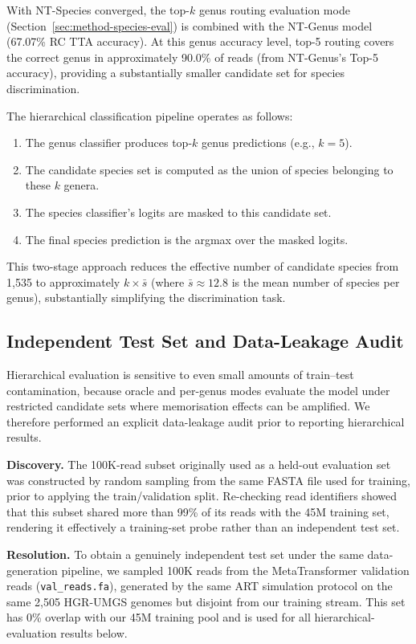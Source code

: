 With NT-Species converged, the top-$k$ genus routing evaluation mode (Section~\ref{sec:method-species-eval}) is combined with the NT-Genus model (67.07\% RC TTA accuracy). At this genus accuracy level, top-5 routing covers the correct genus in approximately 90.0\% of reads (from NT-Genus's Top-5 accuracy), providing a substantially smaller candidate set for species discrimination.

The hierarchical classification pipeline operates as follows:
\begin{enumerate}
    \item The genus classifier produces top-$k$ genus predictions (e.g., $k = 5$).
    \item The candidate species set is computed as the union of species belonging to these $k$ genera.
    \item The species classifier's logits are masked to this candidate set.
    \item The final species prediction is the argmax over the masked logits.
\end{enumerate}

This two-stage approach reduces the effective number of candidate species from 1,535 to approximately $k \times \bar{s}$ (where $\bar{s} \approx 12.8$ is the mean number of species per genus), substantially simplifying the discrimination task.

\subsection{Independent Test Set and Data-Leakage Audit}
\label{sec:spv4-data-leakage}

Hierarchical evaluation is sensitive to even small amounts of train--test contamination, because oracle and per-genus modes evaluate the model under restricted candidate sets where memorisation effects can be amplified.
We therefore performed an explicit data-leakage audit prior to reporting hierarchical results.

\textbf{Discovery.}
The 100K-read subset originally used as a held-out evaluation set was constructed by random sampling from the same FASTA file used for training, prior to applying the train/validation split.
Re-checking read identifiers showed that this subset shared more than 99\% of its reads with the 45M training set, rendering it effectively a training-set probe rather than an independent test set.

\textbf{Resolution.}
To obtain a genuinely independent test set under the same data-generation pipeline, we sampled 100K reads from the MetaTransformer validation reads (\texttt{val\_reads.fa}), generated by the same ART simulation protocol on the same 2,505 HGR-UMGS genomes but disjoint from our training stream.
This set has 0\% overlap with our 45M training pool and is used for all hierarchical-evaluation results below.

